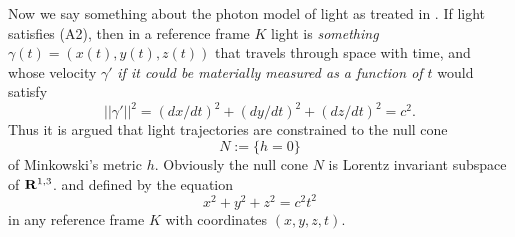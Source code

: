 \documentclass[12pt]{article}
\newcommand{\del}{\partial}
\begin{document}










Now we say something about the photon model of light as treated in \cite[III.XI.6, pp.301]{levi}. If light satisfies (A2), then in a reference frame $K$ light is \emph{something} $\gamma(t)=(x(t),y(t),z(t))$ that travels through space with time, and whose velocity $\gamma'$ \emph{if it could be materially measured as a function of $t$} would satisfy \begin{equation}\label{vel} 
||\gamma'||^2=(dx/dt)^2+(dy/dt)^2+(dz/dt)^2=c^2.
\end{equation} Thus it is argued that light trajectories are constrained to the null cone $$N:=\{h=0\}$$ of Minkowski's metric $h$. Obviously the null cone $N$ is Lorentz invariant subspace of ${\bf{R}}^{1,3}$. and defined by the equation $$x^2+y^2+z^2=c^2 t^2$$ in any reference frame $K$ with coordinates $(x,y,z,t)$.   


\end{document}
